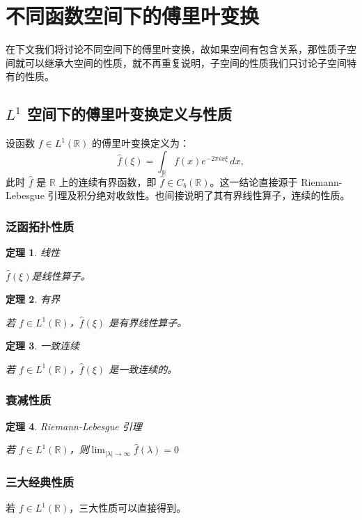\documentclass[12pt,a4paper]{article}
\newcommand{\diff}{\mathop{}\!\mathrm{d}}  %
\def\diff{d}%
\theoremstyle{plain}
\newtheorem{theorem}{定理}[section]
\theoremstyle{definition}
\theoremstyle{remark}
\begin{document}
	
\section{不同函数空间下的傅里叶变换}
	在下文我们将讨论不同空间下的傅里叶变换，故如果空间有包含关系，那性质子空间就可以继承大空间的性质，就不再重复说明，子空间的性质我们只讨论子空间特有的性质。
\subsection{$L^1$ 空间下的傅里叶变换定义与性质}
设函数 $f \in L^1(\mathbb{R})$ 的傅里叶变换定义为：
\[
\hat{f}(\xi) = \int_{\mathbb{R}} f(x) e^{-2\pi i x\xi} \, \diff x,
\]
此时 $\hat{f}$ 是 $\mathbb{R}$ 上的连续有界函数，即 $\hat{f} \in C_b(\mathbb{R})$。这一结论直接源于 Riemann-Lebesgue 引理及积分绝对收敛性。也间接说明了其有界线性算子，连续的性质。


\subsubsection{泛函拓扑性质}
  \begin{theorem}线性
  	
\(\hat{f}(\xi)\)是线性算子。
\end{theorem}

\begin{theorem}有界
	
	若 \( f \in L^1(\mathbb{R}) \)，\(\hat{f}(\xi)\) 是有界线性算子。
\end{theorem}

\begin{theorem}一致连续
	
若 \( f \in L^1(\mathbb{R}) \)，\(\hat{f}(\xi)\) 是一致连续的。
\end{theorem}





\subsubsection{衰减性质}
 \begin{theorem}Riemann-Lebesgue 引理
 	
 若 \( f \in L^1(\mathbb{R}) \)，则$\lim_{|\lambda| \to \infty} \hat{f}(\lambda) = 0 $
 \end{theorem}
 


 \subsubsection{三大经典性质}
 若 \( f \in L^1(\mathbb{R}) \)，三大性质可以直接得到。
 
\end{document}
